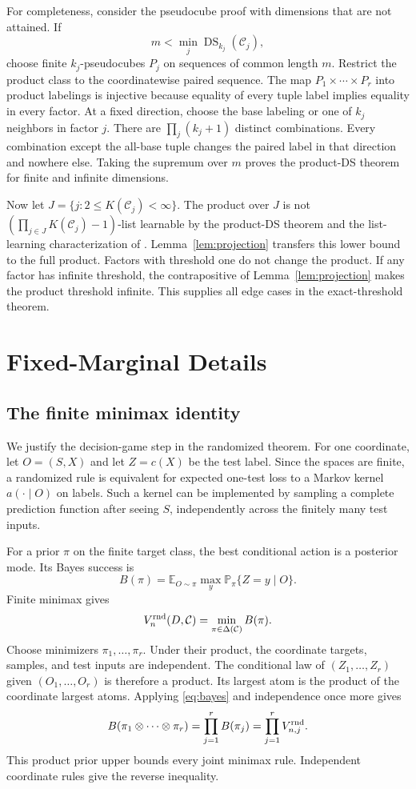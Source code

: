 \documentclass[twoside]{article}
\newcommand{\E}{\mathbb E}
\newcommand{\Prb}{\mathbb P}
\newcommand{\DS}{\operatorname{DS}}
\newcommand{\cC}{\mathcal C}
\newcommand{\ot}{\mathbin\otimes}
\begin{document}
For completeness, consider the pseudocube proof with dimensions that are not attained. If
\[
m<\min_j\DS_{k_j}(\cC_j),
\]
choose finite $k_j$-pseudocubes $P_j$ on sequences of common length $m$. Restrict the product class to the coordinatewise paired sequence. The map $P_1\times\cdots\times P_r$ into product labelings is injective because equality of every tuple label implies equality in every factor. At a fixed direction, choose the base labeling or one of $k_j$ neighbors in factor $j$. There are $\prod_j(k_j+1)$ distinct combinations. Every combination except the all-base tuple changes the paired label in that direction and nowhere else. Taking the supremum over $m$ proves the product-DS theorem for finite and infinite dimensions.

Now let $J=\{j:2\leq K(\cC_j)<\infty\}$. The product over $J$ is not $(\prod_{j\in J}K(\cC_j)-1)$-list learnable by the product-DS theorem and the list-learning characterization of \citet{charikar2023}. Lemma~\ref{lem:projection} transfers this lower bound to the full product. Factors with threshold one do not change the product. If any factor has infinite threshold, the contrapositive of Lemma~\ref{lem:projection} makes the product threshold infinite. This supplies all edge cases in the exact-threshold theorem.

\section{Fixed-Marginal Details}
\label{app:fixed}

\subsection{The finite minimax identity}

We justify the decision-game step in the randomized theorem. For one coordinate, let $O=(S,X)$ and let $Z=c(X)$ be the test label. Since the spaces are finite, a randomized rule is equivalent for expected one-test loss to a Markov kernel $a(\cdot\mid O)$ on labels. Such a kernel can be implemented by sampling a complete prediction function after seeing $S$, independently across the finitely many test inputs.

For a prior $\pi$ on the finite target class, the best conditional action is a posterior mode. Its Bayes success is
\begin{equation}
B(\pi)=\E_{O\sim\pi}\max_y\Prb_\pi\{Z=y\mid O\}.
\label{eq:bayes}
\end{equation}
Finite minimax gives
\begin{equation}
V_n^{\rm rnd}(D,\cC)=\min_{\pi\in\Delta(\cC)}B(\pi).
\label{eq:minimax}
\end{equation}
Choose minimizers $\pi_1,\ldots,\pi_r$. Under their product, the coordinate targets, samples, and test inputs are independent. The conditional law of $(Z_1,\ldots,Z_r)$ given $(O_1,\ldots,O_r)$ is therefore a product. Its largest atom is the product of the coordinate largest atoms. Applying \eqref{eq:bayes} and independence once more gives
\[
B(\pi_1\ot\cdots\ot\pi_r)=\prod_{j=1}^rB(\pi_j)=\prod_{j=1}^rV_{n,j}^{\rm rnd}.
\]
This product prior upper bounds every joint minimax rule. Independent coordinate rules give the reverse inequality.
\end{document}
